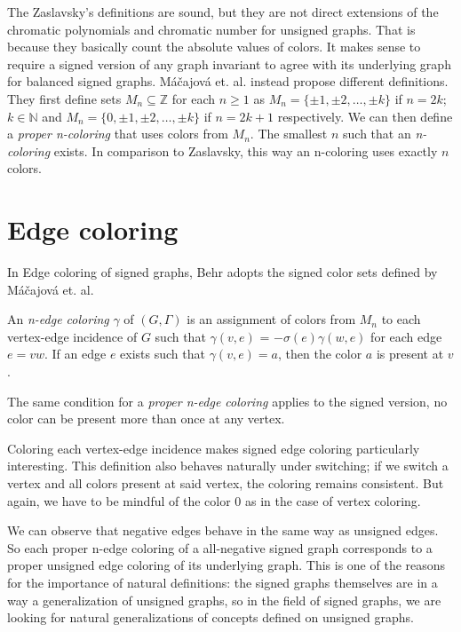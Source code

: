 The Zaslavsky's definitions are sound, but they are not direct extensions of the chromatic polynomials and chromatic number for 
unsigned graphs. That is because they basically count the absolute values of colors. It makes sense to require a signed version of any graph invariant to agree with its underlying graph for balanced signed graphs.
Máčajová et. al.\cite{chromatic-number} instead propose different definitions.
They first define sets $M_n \subseteq \mathbb{Z}$ for each $n \geq 1$ as $M_n = \{\pm 1, \pm 2, \dots , \pm k\}$ if $n = 2k$; $k \in \mathbb{N}$
and $M_n = \{0, \pm 1, \pm 2, \dots , \pm k\}$ if $n = 2k + 1$ respectively.
We can then define a \textit{proper n-coloring} that uses colors from $M_n$. The smallest $n$ such that 
an \textit{n-coloring} exists. In comparison to Zaslavsky, this way an n-coloring uses exactly $n$ colors.

\section{Edge coloring}

In Edge coloring of signed graphs\cite{behr-edge-coloring}, Behr adopts the signed color sets defined by Máčajová et. al.

\begin{definition}[Behr]
    An \textit{n-edge coloring} $\gamma$ of $(G, \Gamma)$ is an assignment of colors from $M_n$ to each vertex-edge incidence of $G$ such that $\gamma (v, e)$ = $- \sigma (e) \gamma(w,e)$ for each edge $e = vw$.
    If an edge $e$ exists such that $\gamma (v,e) = a$, then the color $a$ is present at $v$.
\end{definition}

The same condition for a \textit{proper n-edge coloring} applies to the signed version, no color can be present more than once at any vertex.

Coloring each vertex-edge incidence makes signed edge coloring particularly interesting. 
This definition also behaves naturally under switching; if we switch a vertex and all colors present at said vertex, the coloring remains consistent.
But again, we have to be mindful of the color $0$ as in the case of vertex coloring.

We can observe that negative edges behave in the same way as unsigned edges. 
So each proper n-edge coloring of a all-negative signed graph corresponds to a proper unsigned edge coloring of its underlying graph.
This is one of the reasons for the importance of natural definitions: the signed graphs themselves are in a way a generalization of unsigned graphs, so in the field of signed graphs, we are looking for natural generalizations
of concepts defined on unsigned graphs. 